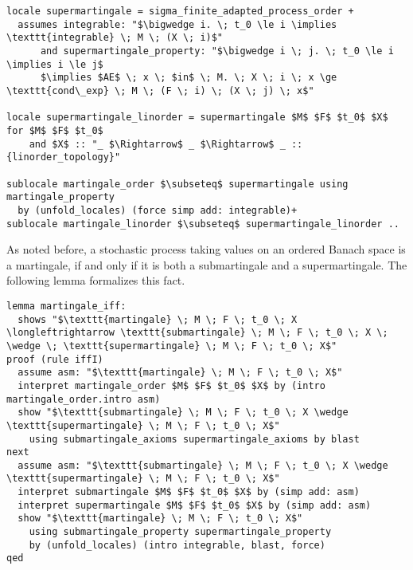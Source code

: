 \begin{isadefinition}
{\small
\begin{lstlisting}[style=isabelle]
locale supermartingale = sigma_finite_adapted_process_order +
  assumes integrable: "$\bigwedge i. \; t_0 \le i \implies \texttt{integrable} \; M \; (X \; i)$"
      and supermartingale_property: "$\bigwedge i \; j. \; t_0 \le i \implies i \le j$
	  $\implies $AE$ \; x \; $in$ \; M. \; X \; i \; x \ge \texttt{cond\_exp} \; M \; (F \; i) \; (X \; j) \; x$"
	  
locale supermartingale_linorder = supermartingale $M$ $F$ $t_0$ $X$ for $M$ $F$ $t_0$ 
	and $X$ :: "_ $\Rightarrow$ _ $\Rightarrow$ _ :: {linorder_topology}"

sublocale martingale_order $\subseteq$ supermartingale using martingale_property
  by (unfold_locales) (force simp add: integrable)+
sublocale martingale_linorder $\subseteq$ supermartingale_linorder ..
\end{lstlisting}
}
\end{isadefinition}

As noted before, a stochastic process taking values on an ordered Banach space is a martingale, if and only if it is both a submartingale and a supermartingale. The following lemma formalizes this fact.

\begin{isalemma}
{\small
\begin{lstlisting}[style=isabelle]
lemma martingale_iff: 
  shows "$\texttt{martingale} \; M \; F \; t_0 \; X \longleftrightarrow \texttt{submartingale} \; M \; F \; t_0 \; X \; \wedge \; \texttt{supermartingale} \; M \; F \; t_0 \; X$"
proof (rule iffI)
  assume asm: "$\texttt{martingale} \; M \; F \; t_0 \; X$"
  interpret martingale_order $M$ $F$ $t_0$ $X$ by (intro martingale_order.intro asm)
  show "$\texttt{submartingale} \; M \; F \; t_0 \; X \wedge \texttt{supermartingale} \; M \; F \; t_0 \; X$" 
    using submartingale_axioms supermartingale_axioms by blast
next
  assume asm: "$\texttt{submartingale} \; M \; F \; t_0 \; X \wedge \texttt{supermartingale} \; M \; F \; t_0 \; X$"
  interpret submartingale $M$ $F$ $t_0$ $X$ by (simp add: asm)
  interpret supermartingale $M$ $F$ $t_0$ $X$ by (simp add: asm)
  show "$\texttt{martingale} \; M \; F \; t_0 \; X$" 
    using submartingale_property supermartingale_property 
    by (unfold_locales) (intro integrable, blast, force)
qed
\end{lstlisting}
}
\end{isalemma}


